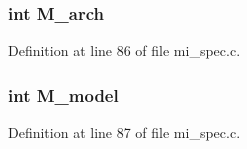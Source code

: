 \subsubsection{\setlength{\rightskip}{0pt plus 5cm}int \bf{M\_\-arch}}\label{ml__spec_8c_459f82172b68fe91c09e0c89d4d55cfa}




Definition at line 86 of file mi\_\-spec.c.
\subsubsection{\setlength{\rightskip}{0pt plus 5cm}int \bf{M\_\-model}}\label{ml__spec_8c_0ff76fcfde2c71e202ea12dd9410bf65}




Definition at line 87 of file mi\_\-spec.c.
